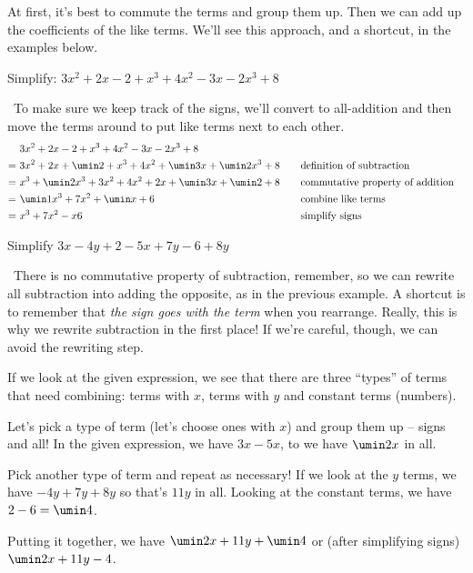 At first, it's best to commute the terms and group them up. Then we can add up the coefficients of the like terms. We'll see this approach, and a shortcut, in the examples below.

\begin{boxex}
Simplify: $3x^2 + 2x - 2 + x^3 + 4x^2 - 3x - 2x^3 + 8$

\exsoln\ To make sure we keep track of the signs, we'll convert to all-addition and then move the terms around to put like terms next to each other.
\[\begin{aligned}
	&~ 3x^2 + 2x - 2 + x^3 + 4x^2 - 3x - 2x^3 + 8\\
=	&~ 3x^2 + 2x + \umin2 + x^3 + 4x^2 + \umin3x + \umin2x^3 + 8
&& \quad \text{definition of subtraction}\\
=	&~ x^3 + \umin2x^3 + 3x^2 + 4x^2 + 2x + \umin3x + \umin2 + 8
&& \quad \text{commutative property of addition}\\
=	&~ \umin1x^3 + 7x^2 + \umin x + 6
&& \quad \text{combine like terms}\\
=	&~ x^3 + 7x^2 - x 6
&& \quad \text{simplify signs}\\
\end{aligned}\]
\end{boxex}

\begin{boxex}
Simplify $3x-4y+2-5x+7y-6+8y$

\exsoln\ There is no commutative property of subtraction, remember, so we can rewrite all subtraction into adding the opposite, as in the previous example. A shortcut is to remember that \textit{the sign goes with the term} when you rearrange. Really, this is why we rewrite subtraction in the first place! If we're careful, though, we can avoid the rewriting step.

If we look at the given expression, we see that there are three ``types'' of terms that need combining: terms with $x$, terms with $y$ and constant terms (numbers).

Let's pick a type of term (let's choose ones with $x$) and group them up -- signs and all! In the given expression, we have $3x-5x$, to we have $\umin2x$ in all.

Pick another type of term and repeat as necessary! If we look at the $y$ terms, we have $-4y+7y+8y$ so that's $11y$ in all. Looking at the constant terms, we have $2-6 = \umin4$.

Putting it together, we have $\umin2x + 11y + \umin4$ or (after simplifying signs) $\umin2x + 11y -4$.
\end{boxex}


